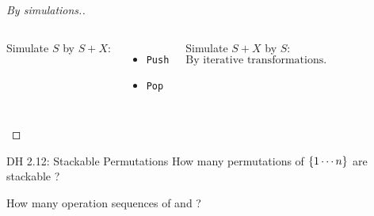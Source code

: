 \begin{frame}{}
  \begin{columns}[b]
  \end{columns}

  \vspace{0.40cm}
  \pause
  \begin{proof}[\large By simulations.]
    \begin{columns}[t]
      \pause
        Simulate $S$ by $S + X$:
	\begin{itemize}
	  \item \texttt{Push}
	  \item \texttt{Pop}
	\end{itemize}
      \pause
        Simulate $S + X$ by $S$:
	\pause
	\[
	  \text{By iterative transformations.}
	\]
    \end{columns}
  \end{proof}
\end{frame}

% 
% 

\begin{frame}{}
  \begin{exampleblock}{DH 2.12: Stackable Permutations}
    How many permutations of $\{1 \cdots n\}$ are stackable ?
  \end{exampleblock}


  \pause
  \centerline{ How many  operation sequences of  and ?}
\end{frame}

